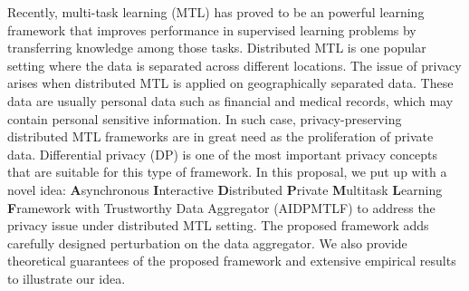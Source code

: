 
Recently, multi-task learning (MTL) has proved to be an powerful learning framework that improves performance in supervised learning problems by transferring knowledge among those tasks. Distributed MTL is one popular setting where the data is separated across different locations. The issue of privacy arises when distributed MTL is applied on geographically separated data. These data are usually personal data such as financial and medical records, which may contain personal sensitive information. In such case, privacy-preserving distributed MTL frameworks are in great need as the proliferation of private data. Differential privacy (DP) is one of the most important privacy concepts that are suitable for this type of framework. In this proposal, we put up with a novel idea: \textbf{A}synchronous \textbf{I}nteractive \textbf{D}istributed \textbf{P}rivate \textbf{M}ultitask \textbf{L}earning \textbf{F}ramework with Trustworthy Data Aggregator (AIDPMTLF) to address the privacy issue under distributed MTL setting. The proposed framework adds carefully designed perturbation on the data aggregator. We also provide theoretical guarantees of the proposed framework and extensive empirical results to illustrate our idea. 